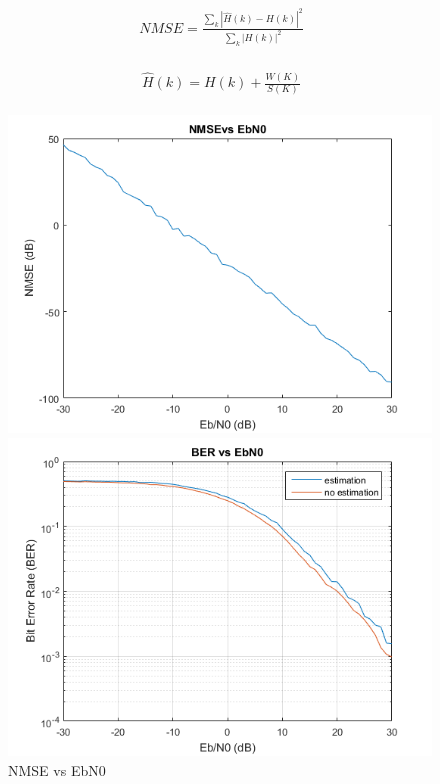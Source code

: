 \documentclass[a4paper]{article}
\begin{document}
   \begin{align} 
					\begin{split}
						\ NMSE = \frac{\sum_{k} |\hat{H}{(k)}-H(k)|^2}               {\sum_{k} |H(k)|^2} 
					\end{split}
					\label{eq:NMSE}
				\end{align}
                
         \begin{align} 
					\begin{split}
						\ \hat{H}{(k)} =H(k)+ \frac{W(K)}{S(K)} 
					\end{split}
					\label{eq:estimation}
				\end{align}       
                
        \begin{figure}[hbtp]
		\begin{minipage}[t]{0.5\linewidth}
			\centering
			\includegraphics[scale=0.5]{figures/NMSE.png}
			\vspace{-0.3cm}
			\centering
			\caption{NMSE vs EbN0}
            \label{fig:NMSE0}
		\end{minipage}
		\begin{minipage}[t]{0.5\linewidth}
			\centering
			\includegraphics[scale=0.5]{figures/estimate_or_not.png}

\end{minipage}
\end{figure}
\end{document}
